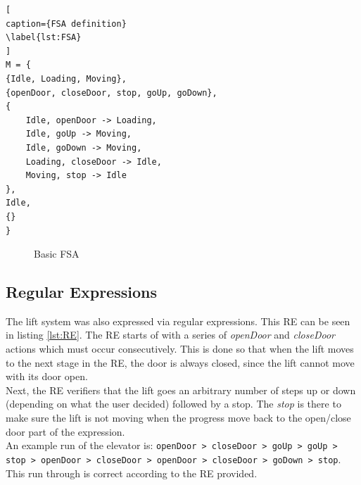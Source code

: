 \documentclass[a4paper, 12pt]{article}
\begin{document}
\begin{lstlisting}[
caption={FSA definition}
\label{lst:FSA}
]
M = {
{Idle, Loading, Moving},
{openDoor, closeDoor, stop, goUp, goDown},
{
    Idle, openDoor -> Loading,
    Idle, goUp -> Moving,
    Idle, goDown -> Moving,
    Loading, closeDoor -> Idle,
    Moving, stop -> Idle
},
Idle,
{}
}
\end{lstlisting}





\begin{figure} %
    \centering %
    \caption{Basic FSA}
    \label{fig:FSA}
\end{figure}


\subsection{Regular Expressions}
The lift system was also expressed via regular expressions. This RE can be seen in listing \ref{lst:RE}. The RE starts of with a series of \textit{openDoor} and \textit{closeDoor} actions which must occur consecutively. This is done so that when the lift moves to the next stage in the RE, the door is always closed, since the lift cannot move with its door open. \\

Next, the RE verifiers that the lift goes an arbitrary number of steps up or down (depending on what the user decided) followed by a stop. The \textit{stop} is there to make sure the lift is not moving when the progress move back to the open/close door part of the expression. \\

An example run of the elevator is:
\texttt{openDoor > closeDoor > goUp > goUp > stop > openDoor > closeDoor > openDoor > closeDoor > goDown > stop}.
This run through is correct according to the RE provided. 
\end{document}
